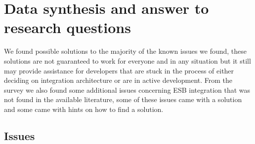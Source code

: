 \documentclass{llncs}
\begin{document}
\section{Data synthesis and answer to research questions}
We found possible solutions to the majority of the known issues we found, these solutions are not guaranteed to work for everyone and in any situation but it still may provide assistance for developers that are stuck in the process of either deciding on integration architecture or are in active development.
From the survey we also found some additional issues concerning ESB integration that was not found in the available literature, some of these issues came with a solution and some came with hints on how to find a solution.

\subsection{Issues}
\end{document}

